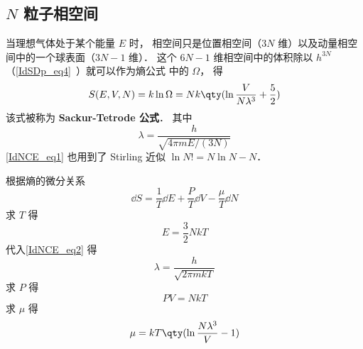 
\begin{issues}
\issueDraft
\end{issues}

\subsection{$N$ 粒子相空间}

当理想气体处于某个能量 $E$ 时， 相空间只是位置相空间（$3N$ 维）以及动量相空间中的一个球表面（$3N-1$ 维）． 这个 $6N - 1$ 维相空间中的体积除以 $h^{3N}$ （\autoref{IdSDp_eq4}~）就可以作为熵公式%
中的 $\Omega$， 得
\begin{equation}\label{IdNCE_eq1}
S(E, V, N) = k\ln \Omega  = Nk \qty(\ln \frac{V}{N\lambda^3} + \frac52)
\end{equation}
该式被称为 \textbf{Sackur-Tetrode 公式}． 其中
\begin{equation}\label{IdNCE_eq2}
\lambda = \frac{h}{\sqrt{4\pi mE/(3N)}}
\end{equation}
\autoref{IdNCE_eq1} 也用到了 Stirling 近似 %
$\ln N! = N\ln N - N$．

根据熵的微分关系 %
\begin{equation}
\dd{S} = \frac{1}{T} \dd{E} + \frac{P}{T} \dd{V} - \frac{\mu}{T} \dd{N}
\end{equation}
求 $T$ 得
\begin{equation}
E = \frac{3}{2}NkT
\end{equation}
代入\autoref{IdNCE_eq2} 得
\begin{equation}
\lambda = \frac{h}{\sqrt{2\pi mkT}}
\end{equation}
求 $P$ 得
\begin{equation}
PV = NkT
\end{equation}
求 $\mu$ 得
\begin{equation}
\mu = kT \qty(\ln \frac{N\lambda^3}{V} - 1)
\end{equation}
